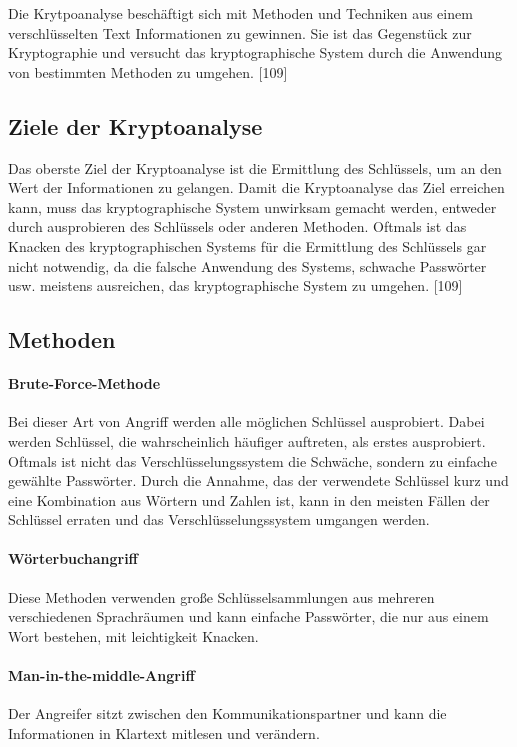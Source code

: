 \documentclass[12pt,a4paper]{report}
\begin{document}
\begin{onehalfspace}
Die Krytpoanalyse beschäftigt sich mit Methoden und Techniken aus einem verschlüsselten Text Informationen zu gewinnen. Sie ist das Gegenstück zur Kryptographie und versucht das kryptographische System durch die Anwendung von bestimmten Methoden zu umgehen. [109]

\subsection{Ziele der Kryptoanalyse}

Das oberste Ziel der Kryptoanalyse ist die Ermittlung des Schlüssels, um an den Wert der Informationen zu gelangen. Damit die Kryptoanalyse das Ziel erreichen kann, muss das kryptographische System unwirksam gemacht werden, entweder durch ausprobieren des Schlüssels oder anderen Methoden. Oftmals ist das Knacken des kryptographischen Systems für die Ermittlung des Schlüssels gar nicht notwendig, da die falsche Anwendung des Systems, schwache Passwörter usw. meistens ausreichen, das kryptographische System zu umgehen. [109]

\subsection{Methoden}

\paragraph{Brute-Force-Methode} Bei dieser Art von Angriff werden alle möglichen Schlüssel ausprobiert. Dabei werden Schlüssel, die wahrscheinlich häufiger auftreten, als erstes ausprobiert. Oftmals ist nicht das Verschlüsselungssystem die Schwäche, sondern zu einfache gewählte Passwörter. Durch die Annahme, das der verwendete Schlüssel kurz und eine Kombination aus Wörtern und Zahlen ist, kann in den meisten Fällen der Schlüssel erraten und das Verschlüsselungssystem umgangen werden.

\paragraph{Wörterbuchangriff} Diese Methoden verwenden große Schlüsselsammlungen aus mehreren verschiedenen Sprachräumen und kann einfache Passwörter, die nur aus einem Wort bestehen, mit leichtigkeit Knacken.

\paragraph{Man-in-the-middle-Angriff} Der Angreifer sitzt zwischen den Kommunikationspartner und kann die Informationen in Klartext mitlesen und verändern.


\end{onehalfspace}
\end{document}
